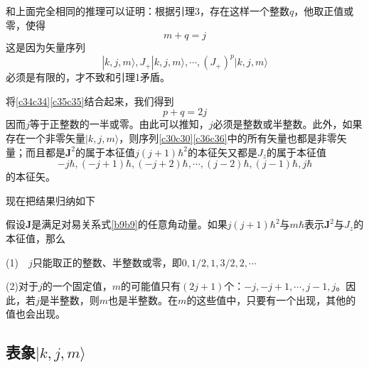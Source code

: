 \documentclass[]{article}
\begin{document}
和上面完全相同的推理可以证明：根据引理3，存在这样一个整数$q$，他取正值或零，使得
\begin{equation}
	m+q=j
	\label{c35c35}
\end{equation}
这是因为矢量序列
\begin{equation}
	|k,j,m\rangle,J_+|k,j,m\rangle,\cdots,(J_+)^p|k,j,m\rangle
	\label{c36c36}
\end{equation}
必须是有限的，才不致和引理1矛盾。\par 
将\eqref{c34c34}\eqref{c35c35}结合起来，我们得到
\begin{equation}
		p+q=2j
\end{equation}
因而$j$等于正整数的一半或零。由此可以推知，$j$必须是整数或半整数。此外，如果存在一个非零矢量$|k,j,m\rangle$，则序列\eqref{c30c30}\eqref{c36c36}中的所有矢量也都是非零矢量；而且都是$\boldsymbol{J}^2$的属于本征值$j(j+1)\hbar^2$的本征矢又都是$J_z$的属于本征值
\begin{equation}
	-j\hbar,(-j+1)\hbar,(-j+2)\hbar,\cdots,(j-2)\hbar,(j-1)\hbar,j\hbar 
\end{equation}
的本征矢。\par 
现在把结果归纳如下\par 
假设$\boldsymbol{J}$是满足对易关系式\eqref{b9b9}的任意角动量。如果$j(j+1)\hbar^2$与$m\hbar$表示$\boldsymbol{J}^2$与$J_z$的本征值，那么\par 
(1)$\quad j$只能取正的整数、半整数或零，即$0,1/2,1,3/2,2,\cdots$\par 
(2)对于$j$的一个固定值，$m$的可能值只有$(2j+1)$个：$-j,-j+1,\cdots,j-1,j$。因此，若$j$是半整数，则$m$也是半整数。在$m$的这些值中，只要有一个出现，其他的值也会出现。
\subsection{表象${|k,j,m\rangle}$}
\end{document}
